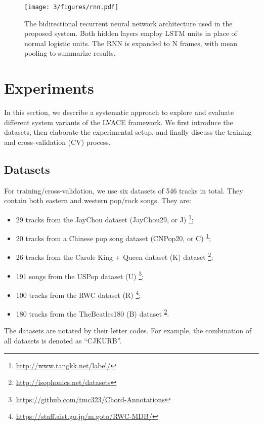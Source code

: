 \begin{figure}[h]
\centering
\texttt{[image: 3/figures/rnn.pdf]}
\caption{The bidirectional recurrent neural network architecture used in the proposed system. Both hidden layers employ LSTM units in place of normal logistic units. The RNN is expanded to N frames, with mean pooling to summarize results.}
\label{fig:3-rnn}
\end{figure}

\section{Experiments} \label{sec:3-exper}
In this section, we describe a systematic approach to explore and evaluate different system variants of the LVACE framework. We first introduce the datasets, then elaborate the experimental setup, and finally discuss the training and cross-validation (CV) process.

\subsection{Datasets}

For training/cross-validation, we use six datasets of 546 tracks in total. They contain both eastern and western pop/rock songs. They are:
\begin{itemize}
	\item 29 tracks from the JayChou dataset (JayChou29, or J) \footnote{\url{http://www.tangkk.net/label/}\label{f1}};
	\item 20 tracks from a Chinese pop song dataset (CNPop20, or C) \textsuperscript{\ref{f1}};
	\item 26 tracks from the Carole King + Queen dataset (K) dataset \footnote{\url{http://isophonics.net/datasets}\label{f2}};
	\item 191 songs from the USPop dataset (U) \footnote{\url{https://github.com/tmc323/Chord-Annotations}};
	\item 100 tracks from the RWC dataset (R) \footnote{\url{https://staff.aist.go.jp/m.goto/RWC-MDB/}};
	\item 180 tracks from the TheBeatles180 (B) dataset \textsuperscript{\ref{f2}}. 
\end{itemize}
The datasets are notated by their letter codes. For example, the combination of all datasets is denoted as ``CJKURB''.

